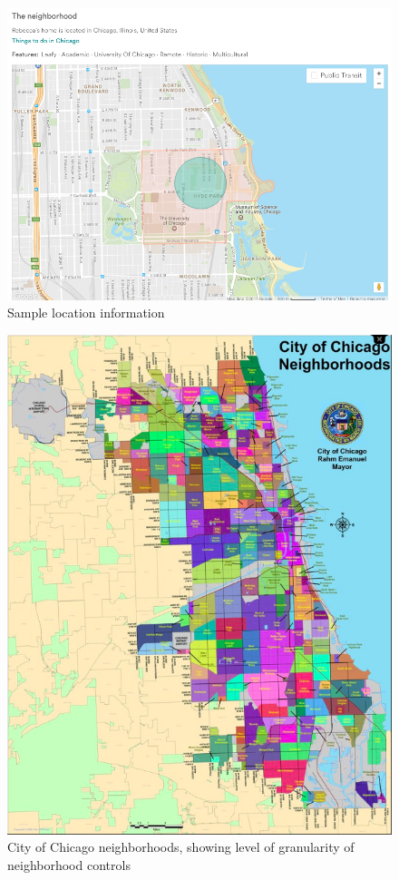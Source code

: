 \begin{figure}\centering
\includegraphics[width=.8\textwidth]{figures/sample5-location}
\caption{Sample location information}
	\label{fig:location}
\end{figure}
\begin{figure}\centering
\includegraphics[width=.8\textwidth]{figures/chicago_city_neighborhoods}
\caption[City of Chicago neighborhoods]{City of Chicago neighborhoods, showing level of granularity of neighborhood controls}
	\label{fig:chicago}
\end{figure}


